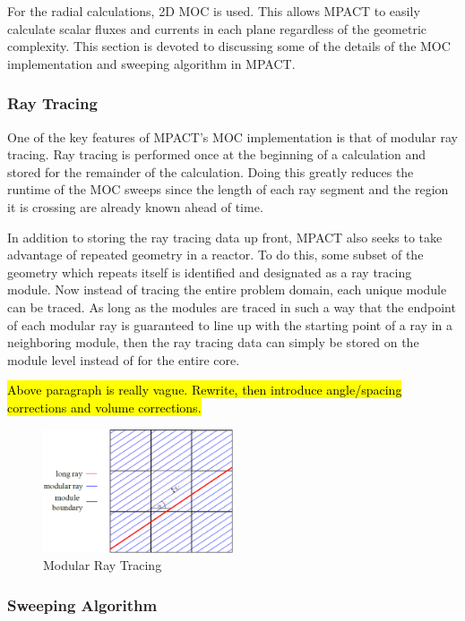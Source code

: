 For the radial calculations, 2D MOC is used.  This allows MPACT to easily calculate scalar fluxes and currents in each plane regardless of the geometric complexity.  This section is devoted to discussing some of the details of the MOC implementation and sweeping algorithm in MPACT.

\subsubsection{Ray Tracing}

One of the key features of MPACT's MOC implementation is that of modular ray tracing.  Ray tracing is performed once at the beginning of a calculation and stored for the remainder of the calculation.  Doing this greatly reduces the runtime of the MOC sweeps since the length of each ray segment and the region it is crossing are already known ahead of time.

In addition to storing the ray tracing data up front, MPACT also seeks to take advantage of repeated geometry in a reactor.  To do this, some subset of the geometry which repeats itself is identified and designated as a ray tracing module.  Now instead of tracing the entire problem domain, each unique module can be traced.  As long as the modules are traced in such a way that the endpoint of each modular ray is guaranteed to line up with the starting point of a ray in a neighboring module, then the ray tracing data can simply be stored on the module level instead of for the entire core.

\hl{Above paragraph is really vague.  Rewrite, then introduce angle/spacing corrections and volume corrections.}

\begin{figure}
\includegraphics[width=0.5\textwidth]{figs/modular_rays.png}
\caption{Modular Ray Tracing}\label{e:ModRays}
\end{figure}

\subsubsection{Sweeping Algorithm}



